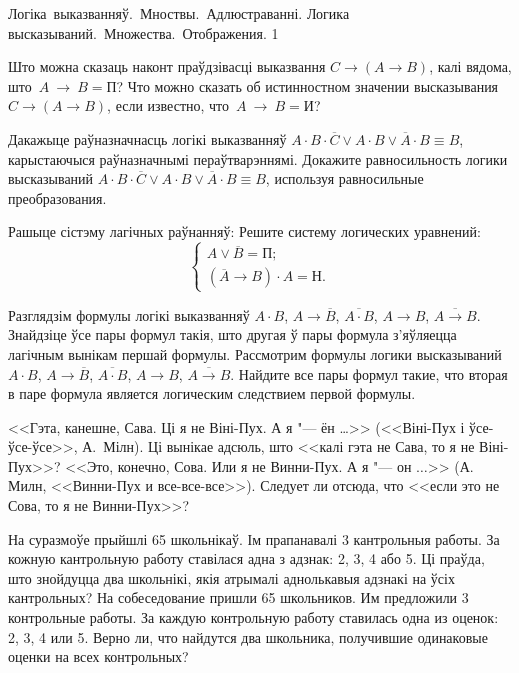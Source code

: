 



\quizTitle
{Логіка~выказванняў.~Мноствы.~Адлюстраванні.}
{Логика высказываний.~Множества.~Отображения.}
{1}

\begin{problemList}

\problemItemSimple
{Што можна сказаць наконт праўдзівасці выказвання  $C \to (A \to B)$, калі вядома, што~$A~\to~B = \mbox{П}$?}
{Что можно сказать об истинностном значении высказывания $C \to (A \to B)$, если известно, что~$A~\to~B = \mbox{И}$?}

\bigskip

\problemItemSimple
{Дакажыце раўназначнасць логікі выказванняў $A \cdot B \cdot \overline{C} \vee A \cdot B \vee \overline{A} \cdot B \equiv B$,
карыстаючыся раўназначнымі пераўтварэннямі.}
{Докажите равносильность логики высказываний $A \cdot B \cdot \overline{C} \vee A \cdot B \vee \overline{A} \cdot B \equiv B$,
используя равносильные преобразования.}

\bigskip

\problemItemWithCommonPart
{Рашыце сістэму лагічных раўнанняў:}
{Решите систему логических уравнений:}
{\[\begin{cases} A \vee \overline{B} = \mbox{П}; \\ (\overline{A} \to B) \cdot A = \mbox{Н}. \end{cases}\]}

\smallskip

\problemItemSimple
{Разглядзім формулы логікі выказванняў $A \cdot B$, $A \to \overline{B}$, $\overline{A \cdot B}$, $A \to B$, $\overline{A \to B}$.
Знайдзіце ўсе пары формул такія, што другая ў пары формула з'яўляецца лагічным вынікам першай формулы.}
{Рассмотрим формулы логики высказываний $A \cdot B$, $A \to \overline{B}$, $\overline{A \cdot B}$, $A \to B$, $\overline{A \to B}$.
Найдите все пары формул такие, что вторая в паре формула является логическим следствием первой формулы.}

\bigskip

\problemItemSimple
{<<Гэта, канешне, Сава. Ці я не Віні-Пух. А я "--- ён \dots>> (<<Віні-Пух і ўсе-ўсе-ўсе>>, А.~Мілн).
Ці вынікае адсюль, што <<калі гэта не Сава, то я не Віні-Пух>>?}
{<<Это, конечно, Сова. Или я не Винни-Пух. А я "--- он $\ldots$>> (А. Милн, <<Винни-Пух и все-все-все>>).
Следует ли отсюда, что <<если это не Сова, то я не Винни-Пух>>?}

\bigskip

\problemItemSimple
{На суразмоўе прыйшлі 65 школьнікаў. Ім прапанавалі 3 кантрольныя работы. За кожную кантрольную работу ставілася адна з адзнак:
2, 3, 4 або 5. Ці праўда, што знойдуцца два школьнікі, якія атрымалі аднолькавыя адзнакі на ўсіх кантрольных?}
{На собеседование пришли 65 школьников. Им предложили 3 контрольные работы. За каждую контрольную работу ставилась одна из оценок:
2, 3, 4 или 5. Верно ли, что найдутся два школьника, получившие одинаковые оценки на всех контрольных?}


\end{problemList}

